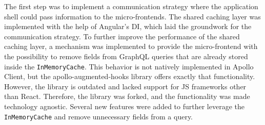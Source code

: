 \bigskip

\noindent The first step was to implement a communication strategy where the application shell could pass information to the micro-frontends. The shared caching layer was implemented with the help of Angular's \ac{DI}, which laid the groundwork for the communication strategy. To further improve the performance of the shared caching layer, a mechanism was implemented to provide the micro-frontend with the possibility to remove fields from GraphQL queries that are already stored inside the \texttt{InMemoryCache}. This behavior is not natively implemented in Apollo Client, but the apollo-augmented-hooks library offers exactly that functionality. However, the library is outdated and lacked support for \ac{JS} frameworks other than React. Therefore, the library was forked, and the functionality was made technology agnostic. Several new features were added to further leverage the \texttt{InMemoryCache} and remove unnecessary fields from a query.

\bigskip

